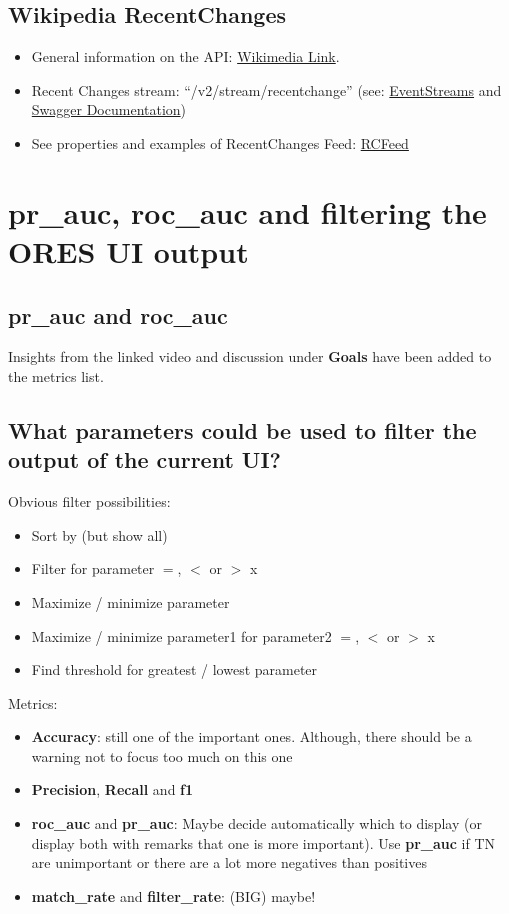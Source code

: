 \documentclass[12pt,a4paper]{article}
\begin{document}
\subsection{Wikipedia RecentChanges}
\begin{itemize}
\item General information on the API: \href{https://www.mediawiki.org/wiki/API:Recent_changes_stream}{Wikimedia Link}.
\item Recent Changes stream: ``/v2/stream/recentchange'' (see: \href{https://wikitech.wikimedia.org/wiki/EventStreams}{EventStreams} and \href{https://stream.wikimedia.org/?doc#!/Streams/get_v2_stream_recentchange}{Swagger Documentation})
\item See properties and examples of RecentChanges Feed: \href{https://www.mediawiki.org/wiki/Manual:RCFeed}{RCFeed}
\end{itemize}
%
%
\section{pr\_auc, roc\_auc and filtering the ORES UI output}
\subsection{pr\_auc and roc\_auc}
Insights from the linked video and discussion under \textbf{Goals} have been added to the metrics list.
\subsection{What parameters could be used to filter the output of the current UI?}
Obvious filter possibilities:
\begin{itemize}
\item Sort by (but show all)
\item Filter for parameter $=$, $<$ or $>$ x
\item Maximize / minimize parameter
\item Maximize / minimize parameter1 for parameter2 $=$, $<$ or $>$ x
\item Find threshold for greatest / lowest parameter
\end{itemize}
Metrics:
\begin{itemize}
\item \textbf{Accuracy}: still one of the important ones. Although, there should be a warning not to focus too much on this one
\item \textbf{Precision}, \textbf{Recall} and \textbf{f1}
\item \textbf{roc\_auc} and \textbf{pr\_auc}: Maybe decide automatically which to display (or display both with remarks that one is more important). Use \textbf{pr\_auc} if TN are unimportant or there are a lot more negatives than positives
\item \textbf{match\_rate} and \textbf{filter\_rate}: (BIG) maybe!
\end{itemize}
\end{document}
